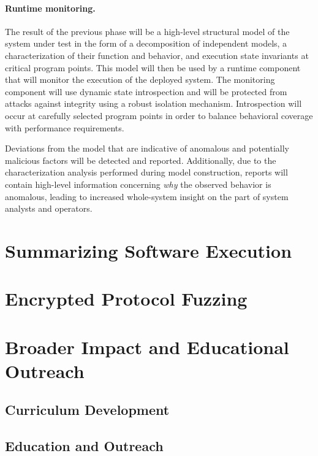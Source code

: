 \documentclass[letterpaper,twoside,11pt,headings=small]{scrartcl}
\begin{document}
\paragraph{Runtime monitoring.} The result of the previous phase will be a
high-level structural model of the system under test in the form of a
decomposition of independent models, a characterization of their function and
behavior, and execution state invariants at critical program points.  This
model will then be used by a runtime component that will monitor the execution
of the deployed system. The monitoring component will use dynamic state
introspection and will be protected from attacks against integrity using a
robust isolation mechanism. Introspection will occur at carefully selected
program points in order to balance behavioral coverage with performance
requirements.

Deviations from the model that are indicative of anomalous and potentially
malicious factors will be detected and reported.  Additionally, due to the
characterization analysis performed during model construction, reports will
contain high-level information concerning \emph{why} the observed behavior is
anomalous, leading to increased whole-system insight on the part of system
analysts and operators.

\section{Summarizing Software Execution}
\label{sec:research:autosummary}



\section{Encrypted Protocol Fuzzing}
\label{sec:research:fuzzing}



\section{Broader Impact and Educational Outreach}
\label{sec:impact}

\subsection{Curriculum Development}
\label{sec:impact:curriculum}

\subsection{Education and Outreach}
\label{sec:impact:education}
\end{document}
